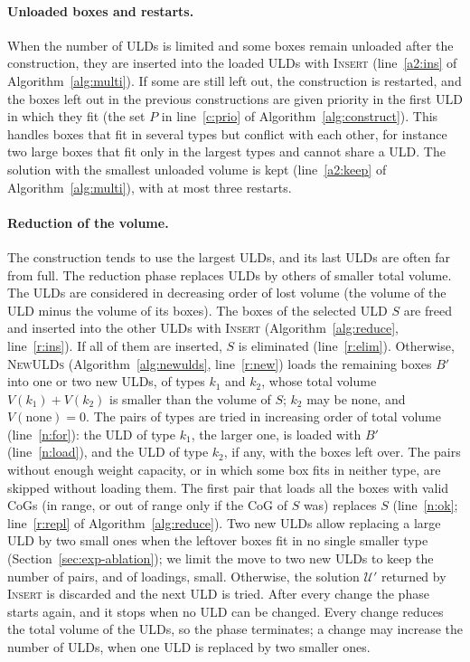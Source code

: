 \paragraph{Unloaded boxes and restarts.}
When the number of ULDs is limited and some boxes remain unloaded after the construction, they
are inserted into the loaded ULDs with \textsc{Insert} (line~\ref{a2:ins} of Algorithm~\ref{alg:multi}). If some are still
left out, the construction is restarted, and the boxes left out in the previous constructions
are given priority in the first ULD in which they fit (the set $P$ in
line~\ref{c:prio} of Algorithm~\ref{alg:construct}). This handles boxes that fit in several types but conflict with each other,
for instance two large boxes that fit only in the largest types and cannot share a ULD. The
solution with the smallest unloaded volume is kept (line~\ref{a2:keep} of Algorithm~\ref{alg:multi}), with at most three
restarts.

\paragraph{Reduction of the volume.}
The construction tends to use the largest ULDs, and its last ULDs are often far from full. The
reduction phase replaces ULDs by others of smaller total volume. The ULDs are considered in decreasing order of lost volume (the volume of the ULD minus
the volume of its boxes). The boxes of the selected ULD $S$ are freed and inserted into the other
ULDs with \textsc{Insert} (Algorithm~\ref{alg:reduce}, line~\ref{r:ins}). If all of them are inserted, $S$ is eliminated (line~\ref{r:elim}).
Otherwise, \textsc{NewULDs} (Algorithm~\ref{alg:newulds}, line~\ref{r:new}) loads the remaining
boxes $B'$ into one or two new ULDs, of types $k_1$ and $k_2$, whose total volume
$V(k_1) + V(k_2)$ is smaller than the volume of $S$; $k_2$ may be none, and $V(\text{none}) = 0$.
The pairs of types are tried in increasing order of total volume (line~\ref{n:for}): the ULD of
type $k_1$, the larger one, is loaded with $B'$ (line~\ref{n:load}), and the ULD of type $k_2$, if
any, with the boxes left over. The pairs without enough weight capacity, or in which some box
fits in neither type, are skipped without loading them. The first pair that loads all
the boxes with valid CoGs (in range, or out of range only if the CoG of $S$ was) replaces $S$
(line~\ref{n:ok}; line~\ref{r:repl} of Algorithm~\ref{alg:reduce}). Two new ULDs allow
replacing a large ULD by two small ones when the leftover boxes fit in no single smaller type
(Section~\ref{sec:exp-ablation}); we limit the move to two new ULDs to keep the number of
pairs, and of loadings, small.
Otherwise, the
solution $\mathcal{U}'$ returned by \textsc{Insert} is discarded and the next ULD is tried. After every change the
phase starts again, and it stops when no ULD can be changed. Every change reduces the total volume
of the ULDs, so the phase terminates; a change may increase the number of ULDs, when one ULD is
replaced by two smaller ones.

